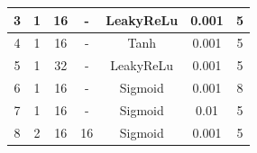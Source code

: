 \documentclass[12pt,a4paper, margin=1in]{article}
\begin{document}
\begin{table}[h]
\begin{tabular}{|c|c|c|c|c|c|c|}
    3           & 1                                                                 & 16                                                                             & -                                                                              & LeakyReLu                                                              & 0.001                                                             & 5               \\ \hline
    4           & 1                                                                 & 16                                                                             & -                                                                              & Tanh                                                                   & 0.001                                                             & 5               \\ \hline
    5           & 1                                                                 & 32                                                                             & -                                                                              & LeakyReLu                                                              & 0.001                                                             & 5               \\ \hline
    6           & 1                                                                 & 16                                                                             & -                                                                              & Sigmoid                                                                & 0.001                                                             & 8               \\ \hline
    7           & 1                                                                 & 16                                                                             & -                                                                              & Sigmoid                                                                & 0.01                                                              & 5               \\ \hline
    8           & 2                                                                 & 16                                                                             & 16                                                                             & Sigmoid                                                                & 0.001                                                             & 5               \\ \hline

\end{tabular}
\end{table}
\end{document}
